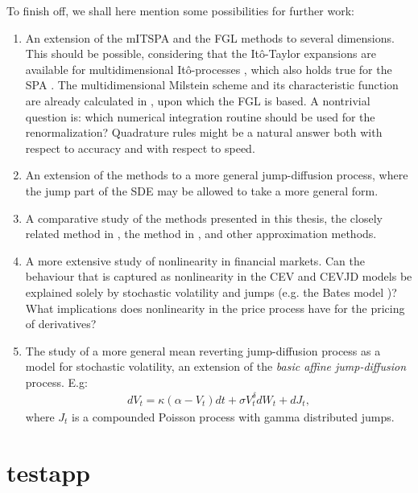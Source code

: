 To finish off, we shall here mention some possibilities for further work:
\begin{enumerate}
	\item An extension of the mITSPA and the FGL methods to several dimensions. This should be possible, considering that the Itô-Taylor expansions are available for multidimensional Itô-processes \citep{kloeden1992numerical}, which also holds true for the SPA \citep{kleppe2008building}.
	The multidimensional Milstein scheme and its characteristic function are already calculated in \citet{zhang2016approximation}, upon which the FGL is based.	
	A nontrivial question is: which numerical integration routine should be used for the renormalization?
	Quadrature rules might be a natural answer both with respect to accuracy and with respect to speed.
	\item An extension of the methods to a more general jump-diffusion process, where the jump part of the SDE may be allowed to take a more general form.
	\item A comparative study of the methods presented in this thesis, the closely related method in \citet{zhang2016approximation}, the method in \citet{varughese2013parameter}, and other approximation methods.
	\item A more extensive study of nonlinearity in financial markets. Can the behaviour that is captured as nonlinearity in the CEV and CEVJD models be explained solely by stochastic volatility and jumps (e.g. the Bates model \citep{bates1996jumps})?
	What implications does nonlinearity in the price process have for the pricing of derivatives?
	\item The study of a more general mean reverting jump-diffusion process as a model for stochastic volatility, an extension of the \textit{basic affine jump-diffusion} process. E.g:
	\begin{align}
	dV_t = \kappa(\alpha-V_t)dt + \sigma V_t^\delta dW_t + dJ_t,
	\end{align}
	where $J_t$ is a compounded Poisson process with gamma distributed jumps.
\end{enumerate}

\appendix
\section{testapp}




